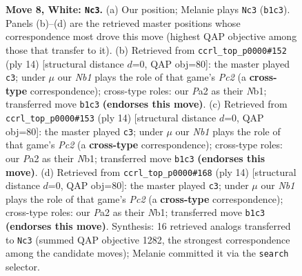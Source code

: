 \documentclass[11pt]{article}
\begin{document}
\begin{figure}[p]
\caption{\textbf{Move 8, White: \texttt{Nc3}.} (a) Our position; Melanie plays \texttt{Nc3} (\texttt{b1c3}). Panels (b)--(d) are the retrieved master positions whose correspondence most drove this move (highest QAP objective among those that transfer to it). (b) Retrieved from \texttt{ccrl\_top\_p0000\#152} (ply 14) [structural distance $d$=0, QAP obj=80]: the master played \texttt{c3}; under $\mu$ our \emph{Nb1} plays the role of that game's \emph{Pc2} (a \textbf{cross-type} correspondence); cross-type roles: our \emph{P}a2 as their \emph{N}b1; transferred move \texttt{b1c3} \textbf{(endorses this move)}. (c) Retrieved from \texttt{ccrl\_top\_p0000\#153} (ply 14) [structural distance $d$=0, QAP obj=80]: the master played \texttt{c3}; under $\mu$ our \emph{Nb1} plays the role of that game's \emph{Pc2} (a \textbf{cross-type} correspondence); cross-type roles: our \emph{P}a2 as their \emph{N}b1; transferred move \texttt{b1c3} \textbf{(endorses this move)}. (d) Retrieved from \texttt{ccrl\_top\_p0000\#168} (ply 14) [structural distance $d$=0, QAP obj=80]: the master played \texttt{c3}; under $\mu$ our \emph{Nb1} plays the role of that game's \emph{Pc2} (a \textbf{cross-type} correspondence); cross-type roles: our \emph{P}a2 as their \emph{N}b1; transferred move \texttt{b1c3} \textbf{(endorses this move)}. Synthesis: 16 retrieved analogs transferred to \texttt{Nc3} (summed QAP objective 1282, the strongest correspondence among the candidate moves); Melanie committed it via the \texttt{search} selector.}
\label{fig:thought-m14}
\end{figure}

\clearpage
\end{document}
